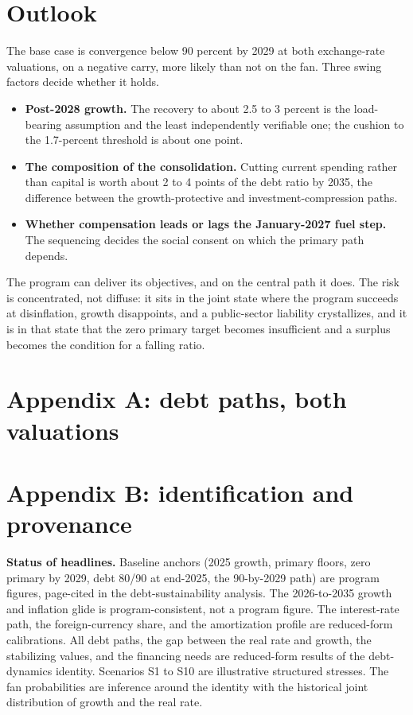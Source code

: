 \documentclass[10pt]{article}
\begin{document}
\section{Outlook}
The base case is convergence below 90 percent by 2029 at both exchange-rate valuations, on a negative
carry, more likely than not on the fan. Three swing factors decide whether it holds.
\begin{itemize}[leftmargin=1.4em,itemsep=1pt]
\item \textbf{Post-2028 growth.} The recovery to about 2.5 to 3 percent is the load-bearing
assumption and the least independently verifiable one; the cushion to the 1.7-percent threshold is
about one point.
\item \textbf{The composition of the consolidation.} Cutting current spending rather than capital is
worth about 2 to 4 points of the debt ratio by 2035, the difference between the growth-protective and
investment-compression paths.
\item \textbf{Whether compensation leads or lags the January-2027 fuel step.} The sequencing decides
the social consent on which the primary path depends.
\end{itemize}
The program can deliver its objectives, and on the central path it does. The risk is concentrated, not
diffuse: it sits in the joint state where the program succeeds at disinflation, growth disappoints,
and a public-sector liability crystallizes, and it is in that state that the zero primary target
becomes insufficient and a surplus becomes the condition for a falling ratio.

\newpage
\section*{Appendix A: debt paths, both valuations}


\section*{Appendix B: identification and provenance}
\textbf{Status of headlines.} Baseline anchors (2025 growth, primary floors, zero primary by 2029,
debt 80/90 at end-2025, the 90-by-2029 path) are program figures, page-cited in the debt-sustainability
analysis. The 2026-to-2035 growth and inflation glide is program-consistent, not a program figure. The
interest-rate path, the foreign-currency share, and the amortization profile are reduced-form
calibrations. All debt paths, the gap between the real rate and growth, the stabilizing values, and the
financing needs are reduced-form results of the debt-dynamics identity. Scenarios S1 to S10 are
illustrative structured stresses. The fan probabilities are inference around the identity with the
historical joint distribution of growth and the real rate.
\end{document}
